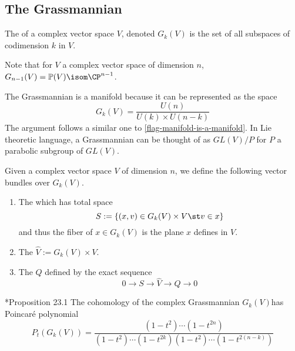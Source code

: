 \documentclass[11pt,leqno,oneside]{amsbook}
\renewcommand{\P}{\mathbb{P}}
\numberwithin{thm}{section}
\begin{document}
\subsection{The Grassmannian}
\begin{defn}
  The  of a complex vector space \(V\), denoted \(G_k(V)\) is the set of
  all subspaces of codimension \(k\) in \(V\).
\end{defn}
\begin{example}
  Note that for \(V\) a complex vector space of dimension \(n\),
  \(G_{n-1}(V) = \P(V) \isom \CP^{n-1}\).
\end{example}
\begin{rmk}
  The Grassmannian is a manifold because it can be represented as the
  space \[
    G_k(V) = \frac{U(n)}{U(k)\times U(n-k)}
  \]
  The argument follows a similar one to
  \ref{flag-manifold-is-a-manifold}. In Lie theoretic language, a Grassmannian can be
  thought of as \(GL(V)/P\) for \(P\) a parabolic subgroup of
  \(GL(V)\).
\end{rmk}
\begin{defn}
  Given a complex vector space \(V\) of dimension \(n\), we define the
  following vector bundles over \(G_k(V)\).
  \begin{enumerate}
  \item The  which has total space \[
      S := \{(x,v) \in G_k(V) \times V \st v \in x\}
    \]
    and thus the fiber of \(x \in G_k(V)\) is the plane \(x\) defines
    in \(V\).
  \item The  \(\hat{V} := G_k(V) \times V\).
  \item The  \(Q\) defined by the exact
    sequence \[
      0 \to S \to \hat{V} \to Q \to 0
    \]
  \end{enumerate}
\end{defn}
\begin{prop}
  \cite{bott-tu}*{Proposition 23.1} The cohomology of the complex
  Grassmannian \(G_k(V)\)has Poincar\'{e} polynomial \[
    P_t(G_k(V)) = \frac{(1-t^2) \cdots (1-t^{2n})}{(1-t^2) \cdots
      (1-t^{2k})(1-t^2) \cdots (1-t^{2(n-k)})}
  \]
\end{prop}
\end{document}
